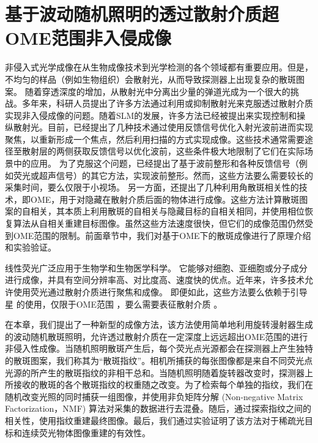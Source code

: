 \chapter{基于波动随机照明的透过散射介质超OME范围非入侵成像}\label{chap:5}

非侵入式光学成像在从生物成像技术\cite{zhao_non-invasive_2001,artzi_vivo_2011}到光学检测\cite{kozloff_non-invasive_2009}的各个领域都有重要应用。但是，不均匀的样品（例如生物组织）会散射光，从而导致探测器上出现复杂的散斑图案\cite{Goodman1976,Bender}。
随着穿透深度的增加，从散射光中分离出少量的弹道光成为一个很大的挑战\cite{Abramson1978,huang_optical_1991}。多年来，科研人员提出了许多方法通过利用或抑制散射光来克服透过散射介质实现非入侵成像的问题。随着SLM的发展，许多方法已经被提出来实现控制和操纵散射光\cite{Mosk2012,rotter_light_2017}。目前，已经提出了几种技术通过使用反馈信号优化入射光波前进而实现聚焦，以重新形成一个焦点，然后利用扫描的方式实现成像\cite{Vellekoop2007,Horstmeyer2015}。这些技术通常需要途径至散射层的两侧获取反馈信号以优化波前，这些条件极大地限制了它们在实际场景中的应用。
为了克服这个问题，已经提出了基于波前整形和各种反馈信号（例如荧光或超声信号）的其它方法\cite{Horstmeyer2015,Katz2019,Popoff2010,Hofer2019}，实现波前整形。然而，这些方法要么需要较长的采集时间，要么仅限于小视场。
另一方面，还提出了几种利用角散斑相关性的技术\cite{bertolotti_non-invasive_2012,katz_non-invasive_2014}，即OME\cite{Freund1988,Yllmaz2019,Osnabrugge}，用于对隐藏在散射介质后面的物体进行成像。这些方法计算散斑图案的自相关，其本质上利用散斑的自相关与隐藏目标的自相关相同，并使用相位恢复算法从自相关重建目标图像。虽然这些方法速度很快，但它们的成像范围仍然受到OME范围的限制。前面章节中，我们对基于OME下的散斑成像进行了原理介绍和实验验证。

线性荧光广泛应用于生物学和生物医学科学\cite{Ruan2020,Lichtman2005,mangeat_super_resolved_2021}。 它能够对细胞、亚细胞或分子成分进行成像，并具有空间分辨率高、对比度高、速度快的优点。近年来，许多技术允许使用荧光通过散射介质进行聚焦和成像。
即便如此，这些方法要么依赖于引导星 \cite{Hhorstmeyer} 的使用，仅限于OME范围 \cite{hofer_wide_2018}，要么需要表征散射介质 \cite{boniface_non_invasive_2020}。

在本章，我们提出了一种新型的成像方法，该方法使用简单地利用旋转漫射器生成的波动随机散斑照明，允许透过散射介质在一定深度上远远超出OME范围的进行非侵入性成像。当随机照明散斑产生后，每个荧光点光源都会在探测器上产生独特的散斑图案，我们称其为“散斑指纹”。相机所捕获的每张图像都是来自不同荧光点光源的所产生的散斑指纹的非相干总和。当随机照明随着旋转器改变时，探测器上所接收的散斑的各个散斑指纹的权重随之改变。为了检索每个单独的指纹，我们在随机改变光照的同时捕获一组图像，并使用非负矩阵分解 (Non-negative Matrix Factorization，NMF) 算法对采集的数据进行去混叠。随后，通过探索指纹之间的相关性，使用指纹重建最终图像。最后，我们通过实验证明了该方法对于稀疏光目标和连续荧光物体图像重建的有效性。

